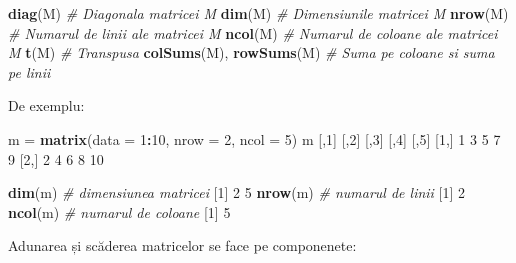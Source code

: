 \documentclass[]{article}
\newenvironment{Shaded}{\begin{snugshade}}{\end{snugshade}}
\newcommand{\CommentTok}[1]{\textcolor[rgb]{0.56,0.35,0.01}{\textit{#1}}}
\newcommand{\DataTypeTok}[1]{\textcolor[rgb]{0.13,0.29,0.53}{#1}}
\newcommand{\DecValTok}[1]{\textcolor[rgb]{0.00,0.00,0.81}{#1}}
\newcommand{\KeywordTok}[1]{\textcolor[rgb]{0.13,0.29,0.53}{\textbf{#1}}}
\newcommand{\NormalTok}[1]{#1}
\newcommand{\OperatorTok}[1]{\textcolor[rgb]{0.81,0.36,0.00}{\textbf{#1}}}
\newcommand{\StringTok}[1]{\textcolor[rgb]{0.31,0.60,0.02}{#1}}
\begin{document}
\begin{Shaded}
\begin{Highlighting}[]
\KeywordTok{diag}\NormalTok{(M) }\CommentTok{# Diagonala matricei M}
\KeywordTok{dim}\NormalTok{(M) }\CommentTok{# Dimensiunile matricei M}
\KeywordTok{nrow}\NormalTok{(M) }\CommentTok{# Numarul de linii ale matricei M}
\KeywordTok{ncol}\NormalTok{(M) }\CommentTok{# Numarul de coloane ale matricei M}
\KeywordTok{t}\NormalTok{(M) }\CommentTok{# Transpusa}
\KeywordTok{colSums}\NormalTok{(M), }\KeywordTok{rowSums}\NormalTok{(M) }\CommentTok{# Suma pe coloane si suma pe linii}
\end{Highlighting}
\end{Shaded}

De exemplu:

\begin{Shaded}
\begin{Highlighting}[]
\NormalTok{m =}\StringTok{ }\KeywordTok{matrix}\NormalTok{(}\DataTypeTok{data =} \DecValTok{1}\OperatorTok{:}\DecValTok{10}\NormalTok{,}
       \DataTypeTok{nrow =} \DecValTok{2}\NormalTok{,}
       \DataTypeTok{ncol =} \DecValTok{5}\NormalTok{)}
\NormalTok{m}
\NormalTok{     [,}\DecValTok{1}\NormalTok{] [,}\DecValTok{2}\NormalTok{] [,}\DecValTok{3}\NormalTok{] [,}\DecValTok{4}\NormalTok{] [,}\DecValTok{5}\NormalTok{]}
\NormalTok{[}\DecValTok{1}\NormalTok{,]    }\DecValTok{1}    \DecValTok{3}    \DecValTok{5}    \DecValTok{7}    \DecValTok{9}
\NormalTok{[}\DecValTok{2}\NormalTok{,]    }\DecValTok{2}    \DecValTok{4}    \DecValTok{6}    \DecValTok{8}   \DecValTok{10}

\KeywordTok{dim}\NormalTok{(m) }\CommentTok{# dimensiunea matricei}
\NormalTok{[}\DecValTok{1}\NormalTok{] }\DecValTok{2} \DecValTok{5}
\KeywordTok{nrow}\NormalTok{(m) }\CommentTok{# numarul de linii}
\NormalTok{[}\DecValTok{1}\NormalTok{] }\DecValTok{2}
\KeywordTok{ncol}\NormalTok{(m) }\CommentTok{# numarul de coloane}
\NormalTok{[}\DecValTok{1}\NormalTok{] }\DecValTok{5}
\end{Highlighting}
\end{Shaded}

Adunarea și scăderea matricelor se face pe componenete:
\end{document}
